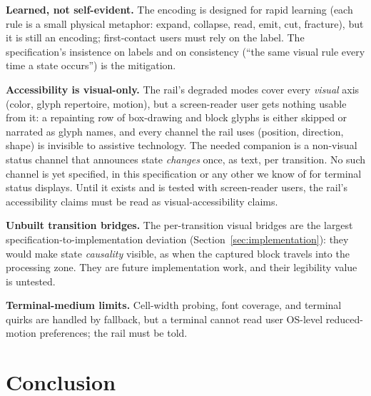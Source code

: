 \documentclass[11pt]{article}
\begin{document}
\textbf{Learned, not self-evident.} The encoding is designed for rapid
learning (each rule is a small physical metaphor: expand, collapse, read,
emit, cut, fracture), but it is still an encoding; first-contact users
must rely on the label. The specification's insistence on labels and on
consistency (``the same visual rule every time a state occurs'') is the
mitigation.

\textbf{Accessibility is visual-only.} The rail's degraded modes cover
every \emph{visual} axis (color, glyph repertoire, motion), but a
screen-reader user gets nothing usable from it: a repainting row of
box-drawing and block glyphs is either skipped or narrated as glyph
names, and every channel the rail uses (position, direction, shape) is
invisible to assistive technology. The needed companion is a non-visual
status channel that announces state \emph{changes} once, as text, per transition. No such channel is yet specified, in this specification or any other we know of for terminal status displays. Until it exists and is tested
with screen-reader users, the rail's accessibility claims must be read
as visual-accessibility claims.

\textbf{Unbuilt transition bridges.} The per-transition visual bridges are the largest specification-to-implementation deviation (Section~\ref{sec:implementation}): they would make state \emph{causality} visible, as when the captured block travels into the processing zone. They are future implementation work, and their legibility value is untested.

\textbf{Terminal-medium limits.} Cell-width probing, font coverage, and
terminal quirks are handled by fallback, but a terminal cannot read user
OS-level reduced-motion preferences; the rail must be told.

\section{Conclusion}
\end{document}
